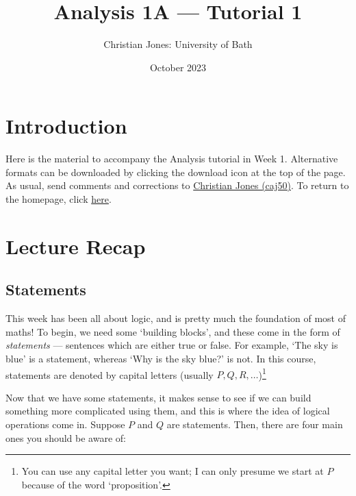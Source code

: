 \documentclass[
  10pt,
  a4paper]{article}
\title{Analysis 1A --- Tutorial 1}
\author{Christian Jones: University of Bath}
\date{October 2023}
\theoremstyle{plain}
\theoremstyle{definition}
\theoremstyle{plain}
\theoremstyle{plain}
\theoremstyle{plain}
\theoremstyle{plain}
\theoremstyle{definition}
\theoremstyle{definition}
\newtheorem*{Order Axioms*}{Order Axioms}\newtheorem{Order Axioms}{Order Axioms}[section]
\theoremstyle{remark}
\theoremstyle{remark}
\begin{document}
\maketitle

{
\setcounter{tocdepth}{2}
\tableofcontents
}
\newpage
{}

\hypertarget{introduction}{%
\section*{Introduction}\label{introduction}}

Here is the material to accompany the Analysis tutorial in Week 1. Alternative formats can be downloaded by clicking the download icon at the top of the page. As usual, send comments and corrections to \href{mailto:caj50@bath.ac.uk}{Christian Jones (caj50)}. To return to the homepage, click \href{http://caj50.github.io/tutoring.html}{here}.

\hypertarget{lecture-recap}{%
\section{Lecture Recap}\label{lecture-recap}}

\hypertarget{statements}{%
\subsection{Statements}\label{statements}}

This week has been all about logic, and is pretty much the foundation of most of maths! To begin, we need some `building blocks', and these come in the form of \emph{statements} --- sentences which are either true or false. For example, \color{blue} `The sky is blue' \color{black} is a statement, whereas \color{red} `Why is the sky blue?' \color{black} is not. In this course, statements are denoted by capital letters (usually \(P,Q,R,\ldots\))\footnote{You can use any capital letter you want; I can only presume we start at \(P\) because of the word `proposition'.}

Now that we have some statements, it makes sense to see if we can build something more complicated using them, and this is where the idea of logical operations come in. Suppose \(P\) and \(Q\) are statements. Then, there are four main ones you should be aware of:
\end{document}
